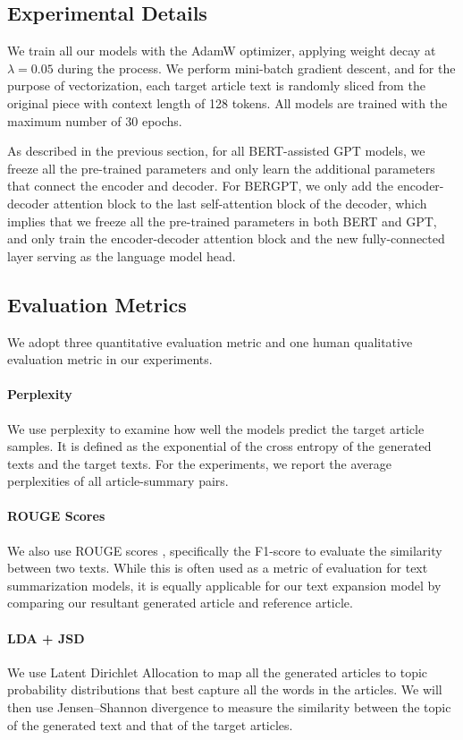 \documentclass{article}
\begin{document}
\subsection{Experimental Details}

We train all our models with the AdamW optimizer\cite{adamw}, applying weight decay at $\lambda = 0.05$ during the process. We perform mini-batch gradient descent, and for the purpose of vectorization, each target article text is randomly sliced from the original piece with context length of 128 tokens. All models are trained with the maximum number of 30 epochs.

As described in the previous section, for all BERT-assisted GPT models, we freeze all the pre-trained parameters and only learn the additional parameters that connect the encoder and decoder. For BERGPT, we only add the encoder-decoder attention block to the last self-attention block of the decoder, which implies that we freeze all the pre-trained parameters in both BERT and GPT, and only train the encoder-decoder attention block and the new fully-connected layer serving as the language model head.

\subsection{Evaluation Metrics}

We adopt three quantitative evaluation metric and one human qualitative evaluation metric in our experiments.
\paragraph{Perplexity} 
We use perplexity to examine how well the models predict the target article samples. It is defined as the exponential of the cross entropy of the generated texts and the target texts. For the experiments, we report the average perplexities of all article-summary pairs.

\paragraph{ROUGE Scores}
We also use ROUGE scores \cite{lin-2004-rouge}, specifically the F1-score to evaluate the similarity between two texts. While this is often used as a metric of evaluation for text summarization models, it is equally applicable for our text expansion model by comparing our resultant generated article and reference article.

\paragraph{LDA + JSD} 
We use Latent Dirichlet Allocation \cite{NIPS2001_2070} to map all the generated articles to topic probability distributions that best capture all the words in the articles. We will then use Jensen–Shannon divergence to measure the similarity between the topic of the generated text and that of the target articles.
\end{document}
